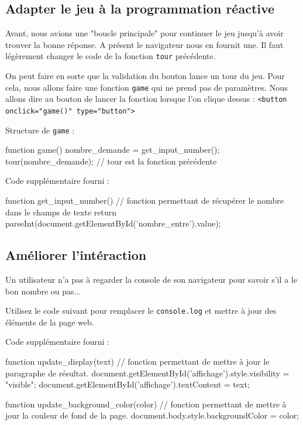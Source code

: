 \documentclass{article} %
\newcommand{\codeJSinline}[2] {
	#1 : \texttt{#2} \linebreak
  }
\newenvironment{codeJS}[1]{%
#1 :  %
\minted{javascript}%
}{%
\endminted%
}
\begin{document}
\subsection{Adapter le jeu à la programmation réactive}

Avant, nous avions une "boucle principale" pour continuer le jeu jusqu'à avoir trouver la bonne réponse. A présent le navigateur nous en fournit une. Il faut légèrement changer le code de la fonction \texttt{tour} précédente. 

On peut faire en sorte que la validation du bouton lance un tour du jeu. Pour cela, nous allons faire une fonction \texttt{game} qui ne prend pas de paramètres. Nous allons dire au bouton de lancer la fonction lorsque l'on clique \codeJSinline{dessus} {<button onclick="game()" type="button">}

\begin{codeJS}{Structure de \texttt{game}}
	function game() {
		nombre_demande = get_input_number();
		tour(nombre_demande); // tour est la fonction précédente
	}

\end{codeJS}

\begin{codeJS}{Code supplémentaire fourni}
	function get_input_number(){
		// fonction permettant de récupérer le nombre dans le champs de texte
		return parseInt(document.getElementById('nombre_entre').value);
	}
\end{codeJS}


\subsection{Améliorer l'intéraction}

Un utilisateur n'a pas à regarder la console de son navigateur pour savoir s'il a le bon nombre ou pas... 

Utilisez le code suivant pour remplacer le \texttt{console.log} et mettre à jour des éléments de la page web.

\begin{codeJS}{Code supplémentaire fourni}
	function update_display(text){
		// fonction permettant de mettre à jour le paragraphe de résultat.
		document.getElementById('affichage').style.visibility = "visible";
		document.getElementById('affichage').textContent = text;
	}

	function update_background_color(color){
		// fonction permettant de mettre à jour la couleur de fond de la page.
		document.body.style.backgroundColor = color;
	}

\end{codeJS}
\end{document}
